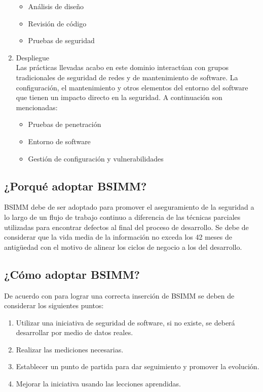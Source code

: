 \documentclass[runningheads,a4paper]{llncs}
\begin{document}
\begin{enumerate}
\begin{itemize}
	\item Análisis de diseño
	\item Revisión de código
	\item Pruebas de seguridad\\
\end{itemize}

\item Despliegue\\

Las prácticas llevadas acabo en este dominio interactúan con grupos tradicionales de seguridad de redes y  de mantenimiento de software. La configuración, el mantenimiento y otros elementos del entorno del software que tienen un impacto directo en la seguridad. A continuación son mencionadas:\\

\begin{itemize}
	\item Pruebas de penetración
	\item Entorno de software
	\item Gestión de configuración y vulnerabilidades
\end{itemize}

\end{enumerate}


\subsection{¿Porqué adoptar \gls{BSIMM}?}
\gls{BSIMM} debe de ser adoptado para promover el aseguramiento de la seguridad a lo largo de un flujo de trabajo continuo a diferencia de las técnicas parciales utilizadas para encontrar defectos al final del proceso de desarrollo. Se debe de considerar que la vida media de la información no exceda los 42 meses de antigüedad con el motivo de alinear los ciclos de negocio a los del desarrollo.

\subsection{¿Cómo adoptar \gls{BSIMM}?}
De acuerdo con \cite{BSIMM_c} para lograr una correcta inserción de \gls{BSIMM} se deben de considerar los siguientes puntos:

\begin{enumerate}
\item Utilizar una iniciativa de seguridad de software, si no existe, se deberá desarrollar por medio de datos reales.
\item Realizar las mediciones necesarias.
\item Establecer un punto de partida para dar seguimiento y promover la evolución.
\item Mejorar la iniciativa usando las lecciones aprendidas.
\end{enumerate}	
\end{document}
